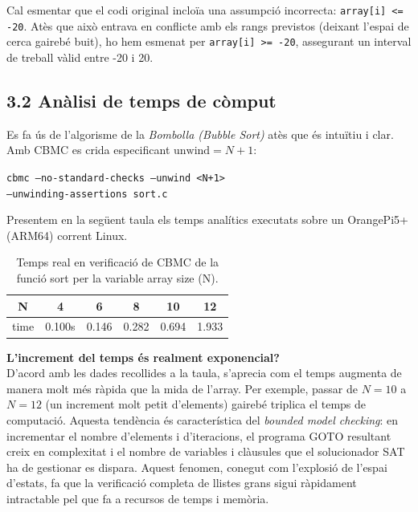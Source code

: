 \documentclass[12pt,a4paper]{article}
\begin{document}
Cal esmentar que el codi original incloïa una assumpció incorrecta: \texttt{array[i] <= -20}. Atès que això entrava en conflicte amb els rangs previstos (deixant l'espai de cerca gairebé buit), ho hem esmenat per \texttt{array[i] >= -20}, assegurant un interval de treball vàlid entre -20 i 20.

\subsection{3.2 Anàlisi de temps de còmput}

Es fa ús de l'algorisme de la \textit{Bombolla (Bubble Sort)} atès que és intuïtiu i clar. Amb CBMC es crida especificant $\text{unwind} = N + 1$:


\begin{tcolorbox}[colback=black!85, coltext=white]
\texttt{cbmc --no-standard-checks --unwind <N+1> \\--unwinding-assertions sort.c}
\end{tcolorbox}

Presentem en la següent taula els temps analítics executats sobre un OrangePi5+(ARM64) corrent Linux.

    \begin{table}[H]
        \centering
        \begin{tabular}{cccccc}
            N & 4 & 6 & 8 & 10 & 12 \\
            \hline
            time & 0.100s & 0.146 & 0.282 & 0.694 & 1.933 \\
        \end{tabular}
        \caption{Temps real en verificació de CBMC de la funció sort per la variable array size (N).}
        \label{tab:placeholder}
    \end{table}

\textbf{L'increment del temps és realment exponencial?} \\
D'acord amb les dades recollides a la taula, s'aprecia com el temps augmenta de manera molt més ràpida que la mida de l'array. Per exemple, passar de $N=10$ a $N=12$ (un increment molt petit d'elements) gairebé triplica el temps de computació. Aquesta tendència és característica del \textit{bounded model checking}: en incrementar el nombre d'elements i d'iteracions, el programa GOTO resultant creix en complexitat i el nombre de variables i clàusules que el solucionador SAT ha de gestionar es dispara. Aquest fenomen, conegut com l'explosió de l'espai d'estats, fa que la verificació completa de llistes grans sigui ràpidament intractable pel que fa a recursos de temps i memòria.
\end{document}

